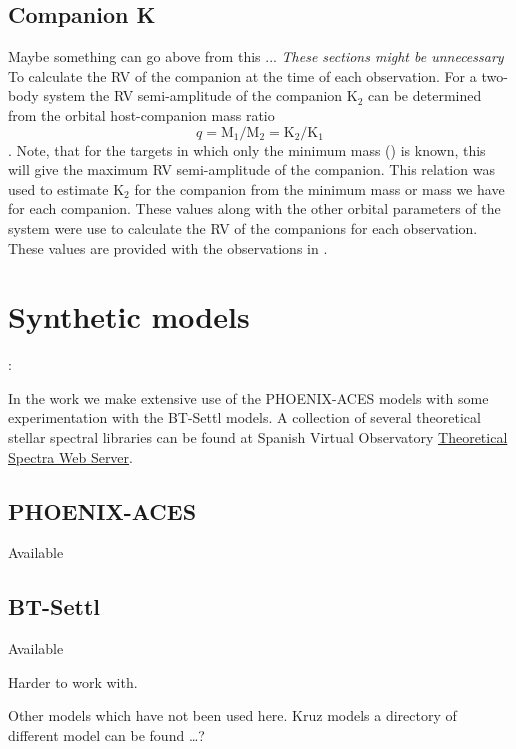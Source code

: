 \subsection{Companion K}  Maybe something can go above from this ...
\label{sec:companion_RV}
\emph{These sections might be unnecessary}\\

To calculate the {RV} of the companion at the time of each observation. For a two-body system the {RV} semi-amplitude of the companion \(\textrm{K}_{2}\) can be determined from the orbital host-companion mass ratio \[q = \textrm{M}_{1}/\textrm{M}_{2} = \textrm{K}_{2}/\textrm{K}_{1}\label{eqn:q_ratio_K2}\].
Note, that for the targets in which only the minimum mass (\mtwosini) is known, this will give the maximum {RV} semi-amplitude of the companion.
This relation was used to estimate \(\textrm{K}_2\) for the companion from the minimum mass or mass we have for each companion. These values along with the other orbital parameters of the system were use to calculate the {RV} of the companions for each observation. These values are provided with the observations in .


\section{Synthetic models}:

In the work we make extensive use of the {PHOENIX-ACES} models with some experimentation with the {BT-Settl} models.
A collection of several theoretical stellar spectral libraries can be found at Spanish Virtual Observatory \href{http://svo2.cab.inta-csic.es/theory/newov/index.php}{Theoretical Spectra Web Server}.

\subsection{PHOENIX-ACES}

Available 


\subsection{BT-Settl}

Available  

Harder to work with.

Other models which have not been used here. Kruz models a directory of different model can be found \ldots{}?


